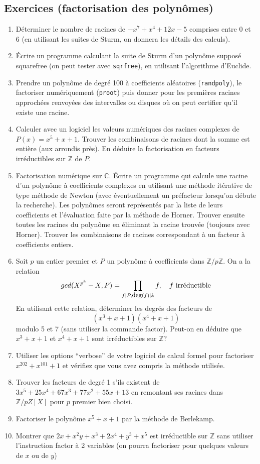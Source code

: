 \documentclass[a4paper,11pt]{article}
\newcommand{\C}{{\mathbb{C}}}
\newcommand{\Z}{{\mathbb{Z}}}
\begin{document}
\subsection{Exercices (factorisation des polynômes)}
\begin{enumerate}
\item Déterminer le nombre de racines de $-x^7+x^4+12x-5$ comprises
entre 0 et 6 (en utilisant les suites de Sturm, on donnera les
d\'etails des calculs).
\item \'Ecrire un programme calculant la suite de Sturm d'un polynôme
supposé squarefree (on peut tester avec \verb|sqrfree|), en utilisant
l'algorithme d'Euclide.
\item Prendre un polyn\^ome de degr\'e 100 \`a coefficients
al\'eatoires (\verb|randpoly|), le factoriser num\'eriquement
(\verb|proot|) puis donner pour les premi\`eres racines
approch\'ees renvoy\'ees des intervalles ou disques o\`u
on peut certifier qu'il existe une racine.
\item Calculer avec un logiciel les valeurs numériques des racines
complexes de $P(x)=x^5+x+1$. Trouver les combinaisons de racines
dont la somme est entière (aux arrondis près). En déduire la factorisation
en facteurs irréductibles sur $\Z$ de $P$.
\item Factorisation numérique sur $\C$. \'Ecrire un programme
qui calcule une racine d'un polynôme à coefficients complexes
en utilisant une méthode itérative de type méthode de Newton 
(avec éventuellement un préfacteur lorsqu'on débute la recherche).
Les polynômes seront représentés par la liste de leurs coefficients
et l'évaluation faite par la méthode de Horner.
Trouver ensuite toutes les racines du polynôme en éliminant la
racine trouvée (toujours avec Horner). Trouver les combinaisons
de racines correspondant à un facteur à coefficients entiers.
\item Soit $p$ un entier premier et $P$ un polynôme \`a
coefficients dans $\Z/p\Z$. On a la relation
\[ gcd(X^{p^k}-X,P) = \prod_{ f | P, \mbox{\small deg}(f) | k} f, 
\quad f \mbox{ irréductible} \]
En utilisant cette relation, 
déterminer les degrés des facteurs de 
\[ (x^3+x+1)(x^4+x+1) \]
modulo 5 et 7 (sans utiliser la commande factor). 
Peut-on en déduire que $x^3+x+1$ et
$x^4+x+1$ sont irréductibles sur $\Z$?
\item Utiliser les options ``verbose'' de votre logiciel de calcul formel
pour factoriser $x^{202}+x^{101}+1$ et vérifiez que vous avez compris
la méthode utilisée.
\item Trouver les facteurs de degré 1 s'ils existent de
$3x^5+25x^4+67x^3+77x^2+55x+13$ en remontant ses racines
dans $\Z/pZ[X]$ pour $p$ premier bien choisi.
\item Factoriser le polynôme $x^5+x+1$ par la méthode 
de Berlekamp.
\item Montrer que $2x+x^2y+x^3+2x^4+y^3+x^5$ est irréductible sur $\Z$
sans utiliser l'instruction factor à 2 variables (on pourra factoriser 
pour quelques valeurs de $x$ ou de $y$)


\end{enumerate}
\end{document}
